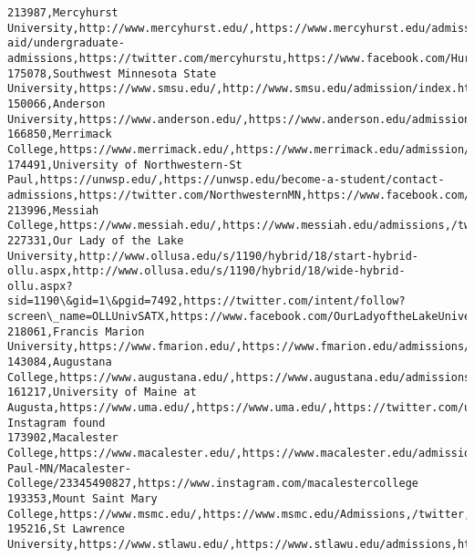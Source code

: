 \documentclass[11pt]{article}
\begin{document}
\begin{Verbatim}[commandchars=\\\{\}]
213987,Mercyhurst University,http://www.mercyhurst.edu/,https://www.mercyhurst.edu/admissions-aid/undergraduate-admissions,https://twitter.com/mercyhurstu,https://www.facebook.com/HurstU,http://instagram.com/mercyhurstu
175078,Southwest Minnesota State University,https://www.smsu.edu/,http://www.smsu.edu/admission/index.html,https://www.twitter.com/smsutoday,https://www.facebook.com/SMSUToday,https://www.instagram.com/smsuadmission/
150066,Anderson University,https://www.anderson.edu/,https://www.anderson.edu/admissions,https://twitter.com/AndersonU,https://www.facebook.com/andersonuniversity,https://www.instagram.com/andersonuniversity/
166850,Merrimack College,https://www.merrimack.edu/,https://www.merrimack.edu/admission/,https://twitter.com/merrimack,https://www.facebook.com/merrimackcollege/,https://www.instagram.com/merrimackcollege/
174491,University of Northwestern-St Paul,https://unwsp.edu/,https://unwsp.edu/become-a-student/contact-admissions,https://twitter.com/NorthwesternMN,https://www.facebook.com/universityofnorthwestern/,https://www.instagram.com/northwesternmn/
213996,Messiah College,https://www.messiah.edu/,https://www.messiah.edu/admissions,/twitter,/facebook,https://www.instagram.com/p/BpZ8hv1no0G/
227331,Our Lady of the Lake University,http://www.ollusa.edu/s/1190/hybrid/18/start-hybrid-ollu.aspx,http://www.ollusa.edu/s/1190/hybrid/18/wide-hybrid-ollu.aspx?sid=1190\&gid=1\&pgid=7492,https://twitter.com/intent/follow?screen\_name=OLLUnivSATX,https://www.facebook.com/OurLadyoftheLakeUniversity,https://www.instagram.com/ollu\_saints/
218061,Francis Marion University,https://www.fmarion.edu/,https://www.fmarion.edu/admissions/,https://twitter.com/FrancisMarionU,https://www.facebook.com/francismarionu/,https://www.instagram.com/francismarionu/
143084,Augustana College,https://www.augustana.edu/,https://www.augustana.edu/admissions,https://twitter.com/Augustana\_IL,https://www.facebook.com/AugustanaCollege,https://instagram.com/augustana\_illinois/
161217,University of Maine at Augusta,https://www.uma.edu/,https://www.uma.edu/,https://twitter.com/umaugusta,https://www.facebook.com/UMAugusta,No Instagram found
173902,Macalester College,https://www.macalester.edu/,https://www.macalester.edu/admissions/,https://www.twitter.com/macalester,https://www.facebook.com/pages/Saint-Paul-MN/Macalester-College/23345490827,https://www.instagram.com/macalestercollege
193353,Mount Saint Mary College,https://www.msmc.edu/,https://www.msmc.edu/Admissions,/twitter,/Alumniaffairs/msmc\_alumni\_facebook\_group,/instagram
195216,St Lawrence University,https://www.stlawu.edu/,https://www.stlawu.edu/admissions,https://twitter.com/stlawrenceu,http://www.facebook.com/StLawrenceU,https://www.instagram.com/stlawrenceu/

\end{Verbatim}
\end{document}
